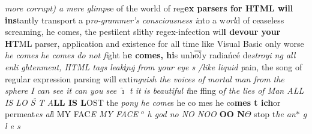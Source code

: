 \raggedright{}{\it more corrupt) a mere glimp}se
of the world of reg{\bf ex parsers for HTML will ins}tantly transport a
p{\it ro-grammer's consciousness i}nto a w{\it orl}d of ceaseless screaming, he
comes\strike{7em}, the pestilent slithy
regex-infection wil{\bf l devour your HT}ML
parser, application and existence for all time like Visual Basic only
worse {\it he comes he comes do not fi}ght
h{\bf e co\rlap{\lower 1pt\hbox{\ \ \thinspace,}}mes, hi}s
unh$\overline{\rm ol}$y radia\'nc\'e
de{\it stroyi\rayz{-1.5ex}{$\hat{}$\ }%
%
\rayzl{0pt}{>\ \thinspace}%
\rayzl{3pt}{<}%
ng all
enli%
%
%
%
%
ghtenment, HTML tags 
{\bfit leak\rayz{0pt}{$\widetilde{\phantom{ak}}$}\c{i}n\.g
from
you\rayz{-2pt}{$\underline{\phantom{ou}}$}r eye\rayz{-1.8ex}{$\vec{\phantom{e}}$}%
s\kern-4pt /\thinspace{}l\rayz{1.6ex}{,\hskip 1pt}ike
liq}uid p}ain, the song of re\rlap{\kern-2pt/}gular
expre\strike{6em}ssion parsing will
exti{\it nguish
the voices of mor{\bfit tal man from the sp}here
I can see it can you see
$\hat\imath$\rayz{2pt}{$\acute{}\,$}%
\rayz{-2.5ex}{$\grave{}$\thinspace}%
\rayzl{-1.9ex}{<\thinspace}%
\rayz{-2.0ex}{$_{{}_\vdash}$}%
t\rayz{1pt}{$\acute{}$}%
\rayzl{0pt}{$_{{}_{{}_\infty}}$}%
%
%
\rayz{-2.5ex}{--}%
\rayzl{-2.5ex}{<}%
\rayz{0pt}{$\underline{\phantom{it}}$}
it is beautiful t}he
f\thinspace{}\thinspace{}fing o{\it f the 
lie{\bfit s of Man ALL IS LO%
\'S%
\rayz{6pt}{$\ddot{}$}%
\rayz{8pt}{$\acute{}$}%
\rayz{-1.6ex}{$^7\hat{\ }$}%
\rayz{-1.5ex}{$=$}%
T A}}{\bf LL IS L}OST
the {\it po\rlap{\ \lil /}ny he come}s 
he c\rayz{-1.9ex}{$\breve{\ }$}o\rayz{1pt}{$\underline{\phantom{co}}$}%
m\strike{5.1em}es he co{\bf mes t ich}or
permeat{\it es al}l MY
FAC{\it E MY FACE $^o$\kern-1pt h god n{\bfit o NO NOO\rayz{1.2pt}{$_{_{\bowtie}}$}%
}}{\bf OO N}$\Theta$ 
stop t{\sl he an\raise 2pt\hbox{$\ast$}%
\rayz{1ex}{$\wr$}\rayzl{1ex}{$\bar{\thinspace}$}%
\rayz{-1pt}{\_}\rayz{-2.3ex}{$\ddot{\thinspace}$}%
\rayz{-1.2ex}{\_}\rayz{-1.4ex}{\_}%
g\rayz{1ex}{$\wr$}\rayz{2.0ex}{$\neg$}%
l\rayz{2pt}{$\acute{\thinspace}$}%
\rayz{-1.6ex}{$\hat{\thinspace}$}\rayz{-1.0ex}{$_\neg$}\rayz{-2.2ex}{$\acute{}$}%
\rayz{-1.4ex}{\_}\rayz{-1.7ex}{\_}%
e\rayz{-2pt}{\tt \_}%
s}\graybox{2.5em}
